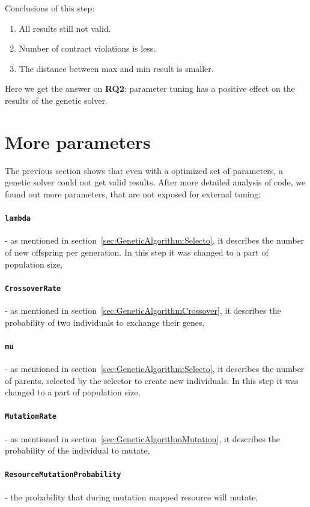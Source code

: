 Conclusions of this step:
\begin{enumerate}
	\item All results still not valid.
	\item Number of contract violations is less.
	\item The distance between max and min result is smaller.
\end{enumerate}
Here we get the answer on \textbf{RQ2}: parameter tuning has a positive effect on the results of the genetic solver.

\section{More parameters}
The previous section shows that even with a optimized set of parameters, a genetic solver could not get valid results.
After more detailed analysis of code, we found out more parameters, that are not exposed for external tuning:
	 \paragraph{\texttt{lambda}} - as mentioned in section~\ref{sec:GeneticAlgorithm:Selecto}, it describes the number of new offspring per generation. In this step it was changed to a part of population size,
	 \paragraph{\texttt{CrossoverRate}} - as mentioned in section~\ref{sec:GeneticAlgorithmCrossover}, it describes the probability of two individuals to exchange their genes,
	 \paragraph{\texttt{mu}} - as mentioned in section~\ref{sec:GeneticAlgorithm:Selecto}, it describes the number of parents, selected by the selector to create new individuals. In this step it was changed to a part of population size,
	 \paragraph{\texttt{MutationRate}} - as mentioned in section~\ref{sec:GeneticAlgorithmMutation}, it describes the probability of the individual to mutate,
	 \paragraph{\texttt{ResourceMutationProbability}} - the probability that during mutation mapped resource will mutate,
